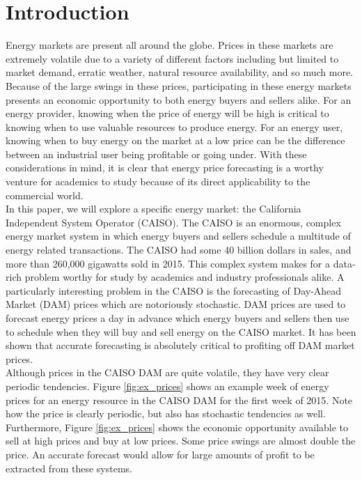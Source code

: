 \documentclass[sigconf]{acmart}
\begin{document}
\section{Introduction}
\label{sec:intro}

Energy markets are present all around the globe. Prices in these markets are extremely volatile due to a variety of different factors including but limited to market demand, erratic weather, natural resource availability, and so much more. Because of the large swings in these prices, participating in these energy markets presents an economic opportunity to both energy buyers and sellers alike. For an energy provider, knowing when the price of energy will be high is critical to knowing when to use valuable resources to produce energy. For an energy user, knowing when to buy energy on the market at a low price can be the difference between an industrial user being profitable or going under. With these considerations in mind, it is clear that energy price forecasting is a worthy venture for academics to study because of its direct applicability to the commercial world.\\

In this paper, we will explore a specific energy market: the California Independent System Operator (CAISO). The CAISO is an enormous, complex energy market system in which energy buyers and sellers schedule a multitude of energy related transactions. The CAISO had some 40 billion dollars in sales, and more than 260,000 gigawatts sold in 2015\cite{CAenergy2}. This complex system makes for a data-rich problem worthy for study by academics and industry professionals alike. A particularly interesting problem in the CAISO is the forecasting of Day-Ahead Market (DAM) prices which are notoriously stochastic. DAM prices are used to forecast energy prices a day in advance which energy buyers and sellers then use to schedule when they will buy and sell energy on the CAISO market. It has been shown that accurate forecasting is absolutely critical to profiting off DAM market prices\cite{Dowling2017}.\\

Although prices in the CAISO DAM are quite volatile, they have very clear periodic tendencies. Figure \ref{fig:ex_prices} shows an example week of energy prices for an energy resource in the CAISO DAM for the first week of 2015. Note how the price is clearly periodic, but also has stochastic tendencies as well. Furthermore, Figure \ref{fig:ex_prices} shows the economic opportunity available to sell at high prices and buy at low prices. Some price swings are almost double the price. An accurate forecast would allow for large amounts of profit to be extracted from these systems.\\
\end{document}
